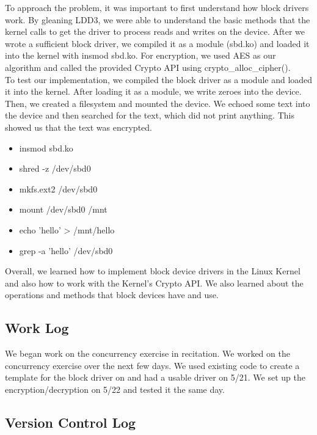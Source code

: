 \documentclass[journal, letterpaper, draftclsnofoot, onecolumn, 10pt]{IEEEtran}
\begin{document}
To approach the problem, it was important to first understand how block drivers work.
By gleaning LDD3, we were able to understand the basic methods that the kernel calls to get the driver to process reads and writes on the device.
After we wrote a sufficient block driver, we compiled it as a module (sbd.ko) and loaded it into the kernel with insmod sbd.ko.
For encryption, we used AES as our algorithm and called the provided Crypto API using crypto\_alloc\_cipher(). \\


To test our implementation, we compiled the block driver as a module and loaded it into the kernel.
After loading it as a module, we write zeroes into the device. Then, we created a filesystem and mounted the device.
We echoed some text into the device and then searched for the text, which did not print anything.
This showed us that the text was encrypted.

\begin{itemize}
    \item insmod sbd.ko
    \item shred -z /dev/sbd0
    \item mkfs.ext2 /dev/sbd0
    \item mount /dev/sbd0 /mnt
    \item echo 'hello' > /mnt/hello
    \item grep -a 'hello' /dev/sbd0
\end{itemize}



Overall, we learned how to implement block device drivers in the Linux Kernel and also how to work with the Kernel's Crypto API.
We also learned about the operations and methods that block devices have and use. \\


\subsection{Work Log}
We began work on the concurrency exercise in recitation. We worked on the concurrency exercise over the next few days.
We used existing code to create a template for the block driver on and had a usable driver on 5/21.
We set up the encryption/decryption on 5/22 and tested it the same day.



\clearpage
\subsection{Version Control Log}



\FloatBarrier



\scalebox{0.8}{
}


\FloatBarrier
\end{document}
